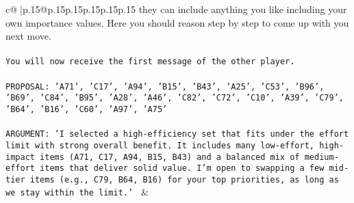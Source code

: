 \documentclass{article}
\begin{document}
{\begin{supertabular}{c@{$\;$}|p{.15\linewidth}@{}p{.15\linewidth}p{.15\linewidth}p{.15\linewidth}p{.15\linewidth}p{.15\linewidth}}
{{{they can include anything you like including your own importance values. Here you should reason step by step to come up with you next move.\\ \tt \\ \tt You will now receive the first message of the other player.\\ \tt \\ \tt PROPOSAL: {'A71', 'C17', 'A94', 'B15', 'B43', 'A25', 'C53', 'B96', 'B69', 'C84', 'B95', 'A28', 'A46', 'C82', 'C72', 'C10', 'A39', 'C79', 'B64', 'B16', 'C60', 'A97', 'A75'}\\ \tt \\ \tt ARGUMENT: {'I selected a high-efficiency set that fits under the effort limit with strong overall benefit. It includes many low-effort, high-impact items (A71, C17, A94, B15, B43) and a balanced mix of medium-effort items that deliver solid value. I’m open to swapping a few mid-tier items (e.g., C79, B64, B16) for your top priorities, as long as we stay within the limit.'} 
	  } 
	   } 
	   } 
	 & \\ 
 

    \theutterance {}  


\end{supertabular}}
\end{document}
